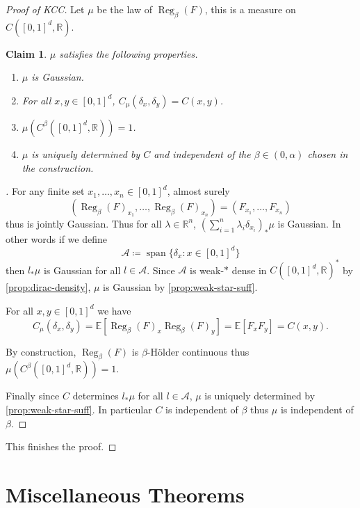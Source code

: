 \documentclass[fontsize=12pt, DIV=10]{scrreprt}
\newtheorem{claim}{Claim}
\theoremstyle{remark}
\newenvironment{subproof}[1][\proofname]{%
  \renewcommand{\qedsymbol}{$\blacksquare$}%
  \begin{proof}[#1]%
}{%
  \end{proof}%
}
\newcommand{\defeq}{\coloneqq}
\newcommand{\R}{\mathbb R}
\newcommand{\E}{\mathbb E}
\newcommand{\calA}{\mathcal A}
\DeclareMathOperator{\reg}{Reg}
\DeclareMathOperator{\spn}{span}
\newcommand{\unitbox}{\ensuremath{[0,1]^d}}
\begin{document}
\begin{proof}[Proof of KCC]
	Let $\mu$ be the law of $\reg_{\beta}(F)$, this is a measure on $C(\unitbox, \R)$. 
	\begin{claim}
		$\mu$ satisfies the following properties.
		\begin{enumerate}
			\item $\mu$ is Gaussian.
			\item For all $x, y \in \unitbox$, $C_{\mu}(\delta_x, \delta_y) = C(x, y)$.
			\item $\mu(C^{\beta}(\unitbox, \R)) = 1$.
			\item $\mu$ is uniquely determined by $C$ and independent of the $\beta \in (0, \alpha)$ chosen in the construction.
		\end{enumerate}
	\end{claim}
	\begin{subproof}
		For any finite set $x_1, \ldots, x_n \in \unitbox$, almost surely
		\begin{equation}
			(\reg_{\beta}(F)_{x_1}, \ldots, \reg_{\beta}(F)_{x_n})
			= (F_{x_1}, \ldots, F_{x_n})
		\end{equation}
		thus is jointly Gaussian. Thus for all $\lambda \in \R^n$, $(\sum_{i=1}^n \lambda_i \delta_{x_i})_* \mu$ is Gaussian. In other words if we define
		\begin{equation}
			\calA \defeq \spn\{ \delta_x : x \in [0, 1]^d\}
		\end{equation}
		then $l_* \mu$ is Gaussian for all $l \in \calA$. Since $\calA$ is weak-$*$ dense in $C([0, 1]^d, \R)^*$ by \vref{prop:dirac-density}, $\mu$ is Gaussian by \vref{prop:weak-star-suff}.

		For all $x, y \in [0, 1]^d$ we have
		\begin{equation}
			C_{\mu}(\delta_x, \delta_y) = \E[\reg_{\beta}(F)_x \reg_{\beta}(F)_y]
			= \E[F_x F_y] = C(x, y).
		\end{equation}

		By construction, $\reg_{\beta}(F)$ is $\beta$-H\"older continuous thus $\mu(C^{\beta}(\unitbox, \R)) = 1$.

		Finally since $C$ determines $l_* \mu$ for all $l \in \calA$, $\mu$ is uniquely determined by \vref{prop:weak-star-suff}. In particular $C$ is independent of $\beta$ thus $\mu$ is independent of $\beta$.
	\end{subproof}

	This finishes the proof.
\end{proof}

\appendix

\chapter{Miscellaneous Theorems}
\end{document}
